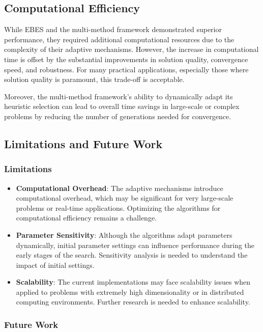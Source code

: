 \documentclass[conference]
{IEEEtran}
\begin{document}
\subsection{Computational Efficiency}

While EBES and the multi-method framework demonstrated superior performance, they required additional computational resources due to the complexity of their adaptive mechanisms. However, the increase in computational time is offset by the substantial improvements in solution quality, convergence speed, and robustness. For many practical applications, especially those where solution quality is paramount, this trade-off is acceptable.

Moreover, the multi-method framework's ability to dynamically adapt its heuristic selection can lead to overall time savings in large-scale or complex problems by reducing the number of generations needed for convergence.

\subsection{Limitations and Future Work}

\subsubsection{Limitations}

\begin{itemize}
    \item \textbf{Computational Overhead}: The adaptive mechanisms introduce computational overhead, which may be significant for very large-scale problems or real-time applications. Optimizing the algorithms for computational efficiency remains a challenge.
    \item \textbf{Parameter Sensitivity}: Although the algorithms adapt parameters dynamically, initial parameter settings can influence performance during the early stages of the search. Sensitivity analysis is needed to understand the impact of initial settings.
    \item \textbf{Scalability}: The current implementations may face scalability issues when applied to problems with extremely high dimensionality or in distributed computing environments. Further research is needed to enhance scalability.
\end{itemize}

\subsubsection{Future Work}
\end{document}
